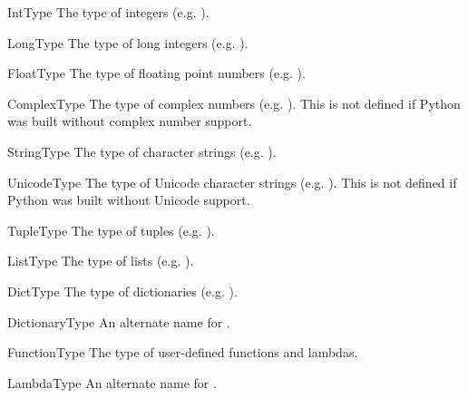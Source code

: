 \begin{datadesc}{IntType}
The type of integers (e.g. ).
\end{datadesc}

\begin{datadesc}{LongType}
The type of long integers (e.g. ).
\end{datadesc}

\begin{datadesc}{FloatType}
The type of floating point numbers (e.g. ).
\end{datadesc}

\begin{datadesc}{ComplexType}
The type of complex numbers (e.g. ).  This is not defined
if Python was built without complex number support.
\end{datadesc}

\begin{datadesc}{StringType}
The type of character strings (e.g. ).
\end{datadesc}

\begin{datadesc}{UnicodeType}
The type of Unicode character strings (e.g. ).  This is
not defined if Python was built without Unicode support.
\end{datadesc}

\begin{datadesc}{TupleType}
The type of tuples (e.g. ).
\end{datadesc}

\begin{datadesc}{ListType}
The type of lists (e.g. \code{[0, 1, 2, 3]}).
\end{datadesc}

\begin{datadesc}{DictType}
The type of dictionaries (e.g. ).
\end{datadesc}

\begin{datadesc}{DictionaryType}
An alternate name for .
\end{datadesc}

\begin{datadesc}{FunctionType}
The type of user-defined functions and lambdas.
\end{datadesc}

\begin{datadesc}{LambdaType}
An alternate name for .
\end{datadesc}

